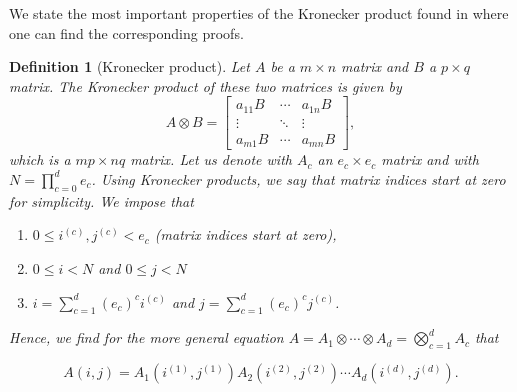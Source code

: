 \documentclass[12pt,a4paper,oneside]{book}
\newtheorem{Definition}{Definition}
\begin{document}
{We state the most important properties of the Kronecker product found in \cite{saatcci2012scalable} where one can find the corresponding proofs. 

\begin{Definition}[Kronecker product]\label{Kronecker_definition}
Let $A$ be a $m \times n$ matrix and $B$ a $p \times q$ matrix. The Kronecker product of these two matrices is given by 
\begin{equation}
A \otimes B
= \begin{bmatrix}
    a_{11}B & \cdots & a_{1n}B  \\
    \vdots    &    \ddots          &  \vdots   \\
    a_{m1}B & \cdots & a_{mn}B
\end{bmatrix}, 
\end{equation} 
which is a $ mp \times nq$ matrix. Let us denote with $A_c$ an $e_c \times e_c$ matrix and with $N = \prod_{c=0}^d e_c$. Using Kronecker products, we say that matrix indices start at zero for simplicity. We impose that 
\begin{enumerate}
\item $0 \leq i^{(c)},j^{(c)} < e_c$ (matrix indices start at zero),
\item $0\leq i < N$ and $ 0\leq j < N$
\item  $i= \sum\nolimits_{c=1}^d (e_c)^c i^{(c)}$ and $ j= \sum\nolimits_{c=1}^d (e_c)^c j^{(c)}$.
\end{enumerate}
Hence, we find for the more general equation $A = A_1 \otimes \cdots \otimes  A_d = \bigotimes_{c=1}^d A_c$ that

\begin{equation}\label{Kronecker1}
A(i,j) = A_1(i^{(1)},j^{(1)})A_2(i^{(2)},j^{(2)}) \cdots A_d(i^{(d)},j^{(d)}). 
\end{equation}
\end{Definition}


}
\end{document}
